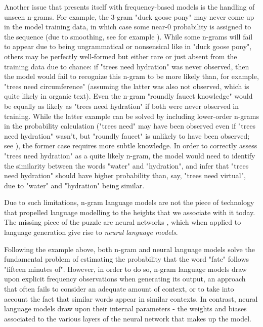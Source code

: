 Another issue that presents itself with frequency-based models is the handling of unseen n-grams. For example, the 3-gram "duck goose pony" may never come up in the model training data, in which case some near-0 probability is assigned to the sequence (due to smoothing, see for example \citet{chen1999empirical}).
While some n-grams will fail to appear due to being ungrammatical or nonsensical like in "duck goose pony", others may be perfectly well-formed but either rare or just absent from the training data due to chance: if "trees need hydration" was never observed, then the model would fail to recognize this n-gram to be more likely than, for example, "trees need circumference" (assuming the latter was also not observed, which is quite likely in organic text).
Even the n-gram "roundly faucet knowledge" would be equally as likely as "trees need hydration" if both were never observed in training. While the latter example can be solved by including lower-order n-grams in the probability calculation ("trees need" may have been observed even if "trees need hydration" wasn't, but "roundly faucet" is unlikely to have been observed; see \citet{katz1987estimation}), the former case requires more subtle knowledge.
In order to correctly assess "trees need hydration" as a quite likely n-gram, the model would need to identify the similarity between the words "water" and "hydration", and infer that "trees need hydration" should have higher probability than, say, "trees need virtual", due to "water" and "hydration" being similar.

Due to such limitations, n-gram language models are not the piece of technology that propelled language modelling to the heights that we associate with it today.
The missing piece of the puzzle are neural networks \citep{anderson1995introduction}, which when applied to language generation give rise to \emph{neural language models}.

Following the example above, both n-gram and neural language models solve the fundamental problem of estimating the probability that the word "fate" follows "fifteen minutes of".
However, in order to do so, n-gram language models draw upon explicit frequency observations when generating its output, an approach that often fails to consider an adequate amount of context, or to take into account the fact that similar words appear in similar contexts.
In contrast, neural language models draw upon their internal parameters - the weights and biases \citep{anderson1995introduction} associated to the various layers of the neural network that makes up the model.

